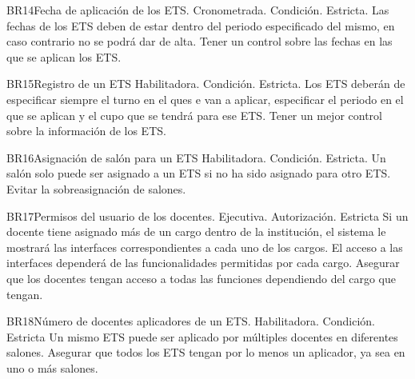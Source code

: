 \begin{BussinesRule}{BR14}{Fecha de aplicación de los ETS.} 
    \BRitem[Tipo:] Cronometrada. 
    \BRitem[Clase:] Condición.
    \BRitem[Nivel:] Estricta.
    \BRitem[Descripción:] Las fechas de los ETS deben de estar dentro del periodo especificado del mismo, en caso contrario no se podrá dar de alta. 
    \BRitem[Motivación:] Tener un control sobre las fechas en las que se aplican los ETS. 
     \hyperlink{}{} 
    \end{BussinesRule}

\begin{BussinesRule}{BR15}{Registro de un ETS} 
    \BRitem[Tipo:] Habilitadora. 
    \BRitem[Clase:] Condición.
    \BRitem[Nivel:] Estricta.
    \BRitem[Descripción:] Los ETS deberán de especificar siempre el turno en el ques e van a aplicar, especificar el periodo en el que se aplican y el cupo que se tendrá para ese ETS.
    \BRitem[Motivación:] Tener un mejor control sobre la información de los ETS.
     \hyperlink{}{} 
    \end{BussinesRule}

\begin{BussinesRule}{BR16}{Asignación de salón para un ETS} 
    \BRitem[Tipo:] Habilitadora. 
    \BRitem[Clase:] Condición.
    \BRitem[Nivel:] Estricta.
    \BRitem[Descripción:] Un salón solo puede ser asignado a un ETS si no ha sido asignado para otro ETS.
    \BRitem[Motivación:] Evitar la sobreasignación de salones.
     \hyperlink{}{} 
    \end{BussinesRule}

\begin{BussinesRule}{BR17}{Permisos del usuario de los docentes.} 
    \BRitem[Tipo:] Ejecutiva.
    \BRitem[Clase:] Autorización.
    \BRitem[Nivel:] Estricta
    \BRitem[Descripción:] Si un docente tiene asignado más de un cargo dentro de la institución, el sistema le mostrará las interfaces correspondientes a cada uno de los cargos. El acceso a las interfaces dependerá de las funcionalidades permitidas por cada cargo.
    \BRitem[Motivación:] Asegurar que los docentes tengan acceso a todas las funciones dependiendo del cargo que tengan.
     \hyperlink{}{} 
    \end{BussinesRule}

\begin{BussinesRule}{BR18}{Número de docentes aplicadores de un ETS.} 
    \BRitem[Tipo:] Habilitadora. 
    \BRitem[Clase:] Condición.
    \BRitem[Nivel:] Estricta
    \BRitem[Descripción:] Un mismo ETS puede ser aplicado por múltiples docentes en diferentes salones.
    \BRitem[Motivación:] Asegurar que todos los ETS tengan por lo menos un aplicador, ya sea en uno o más salones.
     \hyperlink{}{} 
    \end{BussinesRule}

